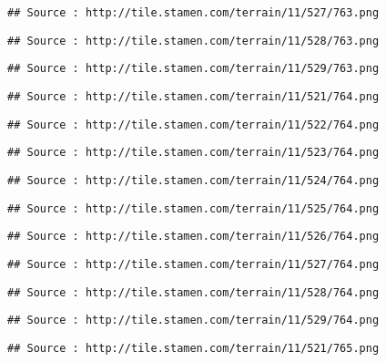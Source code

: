 \documentclass[
]{article}
\begin{document}
\begin{verbatim}
## Source : http://tile.stamen.com/terrain/11/527/763.png
\end{verbatim}

\begin{verbatim}
## Source : http://tile.stamen.com/terrain/11/528/763.png
\end{verbatim}

\begin{verbatim}
## Source : http://tile.stamen.com/terrain/11/529/763.png
\end{verbatim}

\begin{verbatim}
## Source : http://tile.stamen.com/terrain/11/521/764.png
\end{verbatim}

\begin{verbatim}
## Source : http://tile.stamen.com/terrain/11/522/764.png
\end{verbatim}

\begin{verbatim}
## Source : http://tile.stamen.com/terrain/11/523/764.png
\end{verbatim}

\begin{verbatim}
## Source : http://tile.stamen.com/terrain/11/524/764.png
\end{verbatim}

\begin{verbatim}
## Source : http://tile.stamen.com/terrain/11/525/764.png
\end{verbatim}

\begin{verbatim}
## Source : http://tile.stamen.com/terrain/11/526/764.png
\end{verbatim}

\begin{verbatim}
## Source : http://tile.stamen.com/terrain/11/527/764.png
\end{verbatim}

\begin{verbatim}
## Source : http://tile.stamen.com/terrain/11/528/764.png
\end{verbatim}

\begin{verbatim}
## Source : http://tile.stamen.com/terrain/11/529/764.png
\end{verbatim}

\begin{verbatim}
## Source : http://tile.stamen.com/terrain/11/521/765.png
\end{verbatim}
\end{document}
